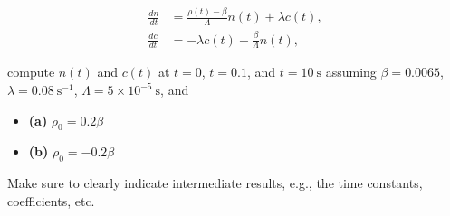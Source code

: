 \[
\begin{aligned}
\frac{dn}{dt}&=\frac{\rho(t)-\beta}{\Lambda}n(t)+\lambda c(t),\\
\frac{dc}{dt}&=-\lambda c(t)+\frac{\beta}{\Lambda}n(t),
\end{aligned}
\]

compute \(n(t)\) and \(c(t)\) at \(t=0\), \(t=0.1\), and
\(t=10~\mathrm{s}\) assuming \(\beta=0.0065\),
\(\lambda=0.08~\mathrm{s^{-1}}\), \(\Lambda=5\times10^{-5}~\mathrm{s}\),
and

\begin{itemize}
\setlength{\itemsep}{0pt}\setlength{\parskip}{0pt}
\item
  \textbf{(a)} \(\rho_0=0.2\beta\)
\item
  \textbf{(b)} \(\rho_0=-0.2\beta\)
\end{itemize}

Make sure to clearly indicate intermediate results, e.g., the time
constants, coefficients, etc.

